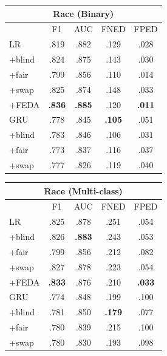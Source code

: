 \begin{table}[t!]
\begin{tabular}{l||cc|cc}
\multicolumn{5}{c}{\bf Race (Binary)} \\\hline
&F1&AUC&FNED&FPED\\\hline\hline
LR& .819 & .882 & .129 & .028\\
+blind& .824 & .875 & .143 & .030\\
+fair& .799 & .856 & .110 & .014 \\
+swap& .825 & .874 & .148 & .033  \\
+FEDA& \bf .836 & \bf .885 & .120 & \bf .011 \\
\hline
GRU& .778 & .845 & \bf .105 & .051 \\
+blind& .783 & .846 & .106 & .031\\
+fair& .773 & .837 & .116 & .037\\
+swap& .777 & .826 & .119 & .040 \\\hline
\end{tabular}
\quad
\begin{tabular}{l||cc|cc}
\multicolumn{5}{c}{\bf Race (Multi-class)} \\\hline
&F1&AUC&FNED&FPED\\\hline\hline
LR& .825 & .878 & .251 & .054 \\
+blind& .826 & \bf .883 & .243 & .053 \\
+fair& .799 & .856 & .212 & .082 \\
+swap& .827 & .878 & .223 & .054 \\
+FEDA& \bf .833 & .876 & .210 & \bf .033\\\hline
GRU& .774 & .848 & .199 & .100\\
+blind& .781 & .850 & \bf .179 & .077\\
+fair& .780 & .839 & .215 & .100\\
+swap& .780 & .830 & .193 & .098 \\\hline
\end{tabular}


\end{table}

